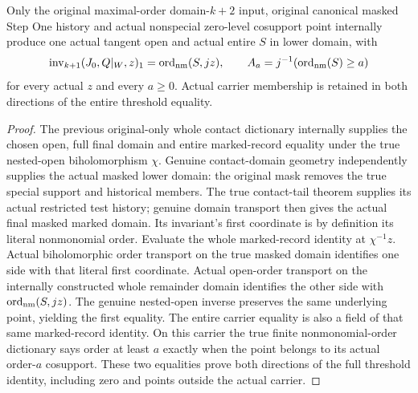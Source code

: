 \begin{theorem}
\label{hir:original-all-level-contact-literal-first-whole-order-dictionary}
\leanok
{}
Only the original maximal-order domain-$k+2$ input, original canonical masked
Step One history and actual nonspecial zero-level cosupport point internally
produce one actual tangent open and actual entire $S$ in lower domain, with
\[
 \operatorname{inv}_{k+1}(J_0,Q|_W,z)_1=\operatorname{ord}_{\rm nm}(S,jz),
 \qquad A_a=j^{-1}(\operatorname{ord}_{\rm nm}(S)\geq a)
\]
for every actual $z$ and every $a\geq0$. Actual carrier membership is retained
in both directions of the entire threshold equality.
\end{theorem}
\begin{proof}
The previous original-only whole contact dictionary internally supplies the
chosen open, full final domain and entire marked-record equality under the
true nested-open biholomorphism $\chi$. Genuine contact-domain geometry independently supplies the actual masked
lower domain: the original mask removes the true special support and historical
members. The true contact-tail theorem supplies its actual restricted test
history; genuine domain transport then gives the actual final masked marked
domain. Its invariant's first coordinate is by definition its literal
nonmonomial order. Evaluate the whole marked-record identity at
$\chi^{-1}z$. Actual biholomorphic order transport on the true masked domain
identifies one side with that literal first coordinate. Actual open-order
transport on the internally constructed whole remainder domain identifies the
other side with $\operatorname{ord}_{\rm nm}(S,jz)$. The genuine nested-open
inverse preserves the same underlying point, yielding the first equality.
The entire carrier equality is also a field of that same marked-record
identity. On this carrier the true finite nonmonomial-order dictionary says
order at least $a$ exactly when the point belongs to its actual order-$a$
cosupport. These two equalities prove both directions of the full threshold
identity, including zero and points outside the actual carrier.
\end{proof}

